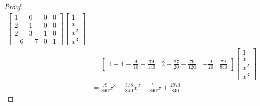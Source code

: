 \begin{proof}
\begin{align*}
       \left[\begin{array}{rrrr}
          1  &   0  & 0  & 0  \\
          2  &   1  & 0  & 0  \\
          2  &   3  & 1  & 0  \\
         -6  &  -7  & 0  & 1
       \end{array}\right]
       \left[\begin{array}{l}
         1   \\
         x   \\
         x^2 \\
         x^3
       \end{array}\right]
  \\&= \left[\begin{array}{c|c|c|c}
          1 + 4 - \frac{9}{10} - \frac{79}{140}  &
          2 - \frac{27}{20} -\frac{79}{120}      &
          -\frac{9}{20}                          &
          \frac{79}{840}
       \end{array}\right]
       \left[\begin{array}{l}
         1   \\
         x   \\
         x^2 \\
         x^3
       \end{array}\right]
  \\&= \frac{79}{840}x^3 - \frac{378}{840}x^2 - \frac{7}{840}x + \frac{2970}{840}
\end{align*}
\end{proof}



